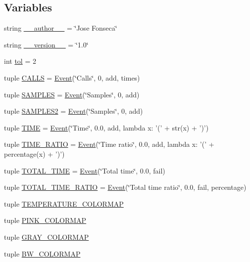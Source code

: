 \subsection*{Variables}
\begin{DoxyCompactItemize}
\item 
string \hyperlink{namespacegprof2dot_aef49cc0d071a48c27f269b1fefa0b259}{\_\-\_\-author\_\-\_\-} = \char`\"{}Jose Fonseca\char`\"{}
\item 
string \hyperlink{namespacegprof2dot_abb4ac492c5f33eb464efcdd38c8a4af0}{\_\-\_\-version\_\-\_\-} = \char`\"{}1.0\char`\"{}
\item 
int \hyperlink{namespacegprof2dot_a442824fd8acb25239ae698ca2c7e08d6}{tol} = 2
\item 
tuple \hyperlink{namespacegprof2dot_a3cfb98044f99cfdfb0cef686b3ed3c74}{CALLS} = \hyperlink{classgprof2dot_1_1Event}{Event}(\char`\"{}Calls\char`\"{}, 0, add, times)
\item 
tuple \hyperlink{namespacegprof2dot_a4e4ea28f29d46701235f133af771103f}{SAMPLES} = \hyperlink{classgprof2dot_1_1Event}{Event}(\char`\"{}Samples\char`\"{}, 0, add)
\item 
tuple \hyperlink{namespacegprof2dot_a58b6460141073b790688ed1dd4d427ee}{SAMPLES2} = \hyperlink{classgprof2dot_1_1Event}{Event}(\char`\"{}Samples\char`\"{}, 0, add)
\item 
tuple \hyperlink{namespacegprof2dot_a6d330baab773f0f34c75fa91c763cbd3}{TIME} = \hyperlink{classgprof2dot_1_1Event}{Event}(\char`\"{}Time\char`\"{}, 0.0, add, lambda x: '(' + str(x) + ')')
\item 
tuple \hyperlink{namespacegprof2dot_ac93e094e954c5b58088dc398a764670b}{TIME\_\-RATIO} = \hyperlink{classgprof2dot_1_1Event}{Event}(\char`\"{}Time ratio\char`\"{}, 0.0, add, lambda x: '(' + percentage(x) + ')')
\item 
tuple \hyperlink{namespacegprof2dot_a3b63ba497b1ebe0c63064d7c77123930}{TOTAL\_\-TIME} = \hyperlink{classgprof2dot_1_1Event}{Event}(\char`\"{}Total time\char`\"{}, 0.0, fail)
\item 
tuple \hyperlink{namespacegprof2dot_a09afab61d414ac377c75fc45a6ea503e}{TOTAL\_\-TIME\_\-RATIO} = \hyperlink{classgprof2dot_1_1Event}{Event}(\char`\"{}Total time ratio\char`\"{}, 0.0, fail, percentage)
\item 
tuple \hyperlink{namespacegprof2dot_a4e72c47d6d17a030a03d562812c1a32a}{TEMPERATURE\_\-COLORMAP}
\item 
tuple \hyperlink{namespacegprof2dot_ac297cc5a9b66874d10fdf32f4fe69417}{PINK\_\-COLORMAP}
\item 
tuple \hyperlink{namespacegprof2dot_af6ef5bd07ae324a28a57189c326a514b}{GRAY\_\-COLORMAP}
\item 
tuple \hyperlink{namespacegprof2dot_a7f79294d4643a0627ba9548bcce0da5b}{BW\_\-COLORMAP}
\end{DoxyCompactItemize}


